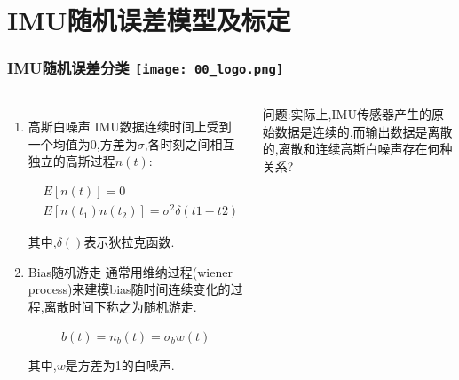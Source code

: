 \section{IMU随机误差模型及标定}

\begin{comment}
\end{comment}
\begin{frame}
\frametitle{IMU随机误差分类 \hfill \texttt{[image: 00\_logo.png]}}
\begin{columns}
  
	\begin{enumerate}
		\item {\color{red}高斯白噪声} \quad		
		IMU数据连续时间上受到一个均值为0,方差为$\sigma$,各时刻之间相互独立的高斯过程$n(t)$:

\begin{equation}
  \begin{split}
    & E[n(t)] = 0 \\
    & E[n(t_1)n(t_2)] = \sigma^2 \delta(t1-t2)
  \end{split}
\end{equation}

其中,$\delta()$表示狄拉克函数.

	\item {\color{red}Bias随机游走}
	通常用维纳过程(wiener process)来建模bias随时间连续变化的过程,离散时间下称之为随机游走.

\begin{equation}
  \dot{b}(t) = n_b(t) = \sigma_b w(t)
\end{equation}

其中,$ w$是方差为1的白噪声.


\end{enumerate}
  
问题:实际上,IMU传感器产生的原始数据是连续的,而输出数据是离散的,离散和连续高斯白噪声存在何种关系?

  

\end{columns}
\end{frame}


